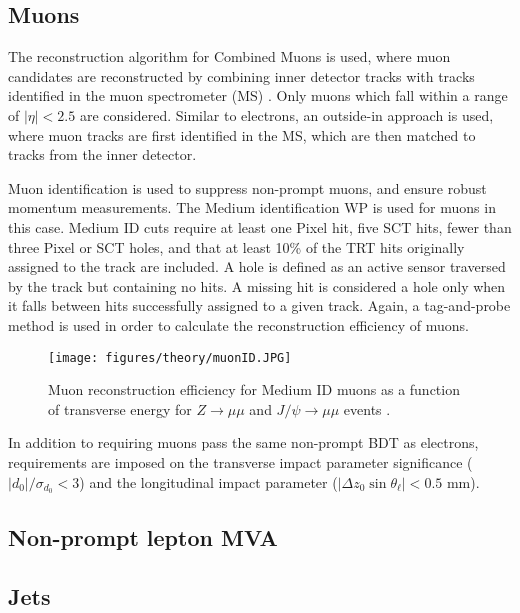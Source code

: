 \subsection{Muons}
\label{obj:muon}
                   
The reconstruction algorithm for Combined Muons is used, where muon candidates are reconstructed by combining inner detector tracks with tracks identified in the muon spectrometer (MS) \cite{PERF-2014-05}. Only muons which fall within a range of $|\eta| < 2.5$ are considered. Similar to electrons, an outside-in approach is used, where muon tracks are first identified in the MS, which are then matched to tracks from the inner detector. %

Muon identification is used to suppress non-prompt muons, and ensure robust momentum measurements. The Medium identification WP is used for muons in this case. Medium ID cuts require at least one Pixel hit, five SCT hits, fewer than three Pixel or SCT holes, and that at least 10\% of the TRT hits originally assigned to the track are included. A hole is defined as an active sensor traversed by the track but containing no hits. A missing hit is considered a hole only when it falls between hits successfully assigned to a given track. Again, a tag-and-probe method is used in order to calculate the reconstruction efficiency of muons.

\begin{figure}[H]
\centering
   \texttt{[image: figures/theory/muonID.JPG]}
\caption{Muon reconstruction efficiency for Medium ID muons as a function of transverse energy for $Z\rightarrow \mu\mu$ and $J/\psi\rightarrow\mu\mu$ events \cite{PERF-2014-05}.}
\label{fig:eEffEt}
\end{figure}

In addition to requiring muons pass the same non-prompt BDT as electrons, requirements are imposed on the transverse impact parameter significance ($|d_0|/\sigma_{d_0}<3$) and the longitudinal impact parameter ($|\Delta z_0 \sin \theta_\ell|<0.5$ mm).
 
\subsection{Non-prompt lepton MVA}
\label{sec:lepMVA}


\subsection{Jets}
\label{subsec:jets}

